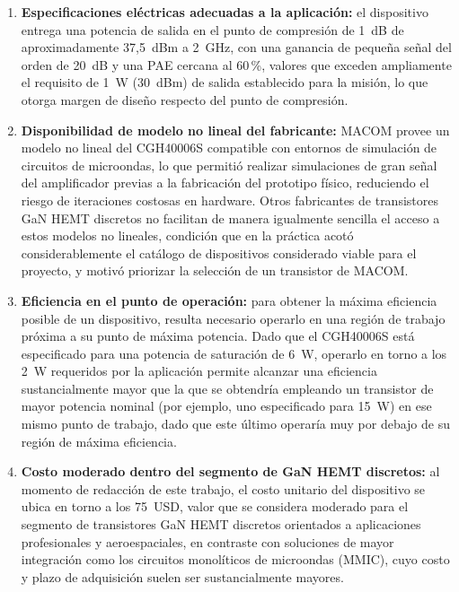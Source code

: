 \begin{enumerate}
    \item \textbf{Especificaciones eléctricas adecuadas a la aplicación:} el dispositivo entrega una potencia de salida en el punto de compresión de 1~dB de aproximadamente 37,5~dBm a 2~GHz, con una ganancia de pequeña señal del orden de 20~dB y una PAE cercana al 60\,\%, valores que exceden ampliamente el requisito de 1~W (30~dBm) de salida establecido para la misión, lo que otorga margen de diseño respecto del punto de compresión.

    \item \textbf{Disponibilidad de modelo no lineal del fabricante:} MACOM provee un modelo no lineal del CGH40006S compatible con entornos de simulación de circuitos de microondas, lo que permitió realizar simulaciones de gran señal del amplificador previas a la fabricación del prototipo físico, reduciendo el riesgo de iteraciones costosas en hardware. Otros fabricantes de transistores GaN HEMT discretos no facilitan de manera igualmente sencilla el acceso a estos modelos no lineales, condición que en la práctica acotó considerablemente el catálogo de dispositivos considerado viable para el proyecto, y motivó priorizar la selección de un transistor de MACOM.
    
    \item \textbf{Eficiencia en el punto de operación:} para obtener la máxima eficiencia posible de un dispositivo, resulta necesario operarlo en una región de trabajo próxima a su punto de máxima potencia. Dado que el CGH40006S está especificado para una potencia de saturación de 6~W, operarlo en torno a los 2~W requeridos por la aplicación permite alcanzar una eficiencia sustancialmente mayor que la que se obtendría empleando un transistor de mayor potencia nominal (por ejemplo, uno especificado para 15~W) en ese mismo punto de trabajo, dado que este último operaría muy por debajo de su región de máxima eficiencia.

    \item \textbf{Costo moderado dentro del segmento de GaN HEMT discretos:} al momento de redacción de este trabajo, el costo unitario del dispositivo se ubica en torno a los 75~USD, valor que se considera moderado para el segmento de transistores GaN HEMT discretos orientados a aplicaciones profesionales y aeroespaciales, en contraste con soluciones de mayor integración como los circuitos monolíticos de microondas (MMIC), cuyo costo y plazo de adquisición suelen ser sustancialmente mayores.

\end{enumerate}

